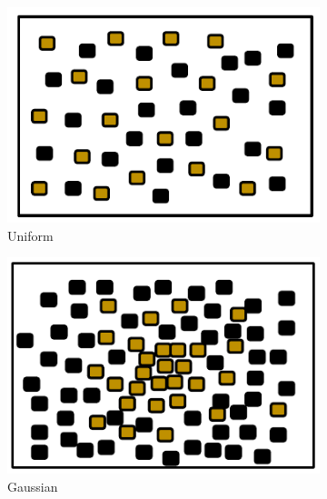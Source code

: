 \begin{figure} [h]
        \centering
        \begin{subfigure}[b]{0.21\textwidth}
                \includegraphics[width=\textwidth]{chapters/chapter4/figures/uniformenv.pdf}
                \caption{Uniform}
                \label{fig:uniformenv}
        \end{subfigure}%
		\begin{subfigure}[b]{0.2\textwidth}
                        \includegraphics[width=\textwidth]{chapters/chapter4/figures/gaussianenv}
                        \caption{Gaussian}
                        \label{fig:gaussianenv}
       \end{subfigure}
        \begin{subfigure}[b]{0.205\textwidth}

\end{subfigure}
\end{figure}
